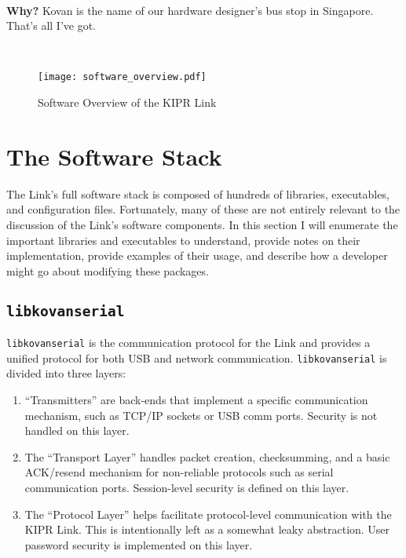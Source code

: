 \documentclass[12pt,letterpaper]{article}
\newcommand{\bcolorbox}[4]{\noindent \\ \fcolorbox{#1}{#2} {\parbox{\textwidth}{\vspace{.1em}\textbf{#3} #4\vspace{.1em}}} \\}
\newcommand{\why}[1]{\bcolorbox{black}{GhostWhite}{Why?}{#1}}
\begin{document}
	\why{Kovan is the name of our hardware designer's bus stop in Singapore. That's all I've got.}
	
	\begin{figure}[H]
		\begin{center}
			\texttt{[image: software\_overview.pdf]}
			\caption{Software Overview of the KIPR Link}
		\end{center}
	\end{figure}
	
	\section{The Software Stack}
	
	The Link's full software stack is composed of hundreds of libraries, executables, and configuration files. Fortunately, many of these
	are not entirely relevant to the discussion of the Link's software components. In this section I will enumerate the important libraries
	and executables to understand, provide notes on their implementation, provide examples of their usage, and describe how a developer
	might go about modifying these packages.
	
	\subsection{\texttt{libkovanserial}}
	\texttt{libkovanserial} is the communication protocol for the Link and provides a unified protocol for both USB and
	network communication. \texttt{libkovanserial} is divided into three layers:
	\begin{enumerate}
		\setlength{\itemsep}{0em}
		\item ``Transmitters'' are back-ends that implement a specific communication mechanism, such as TCP/IP sockets or USB comm ports.
		Security is not handled on this layer.
		\item The ``Transport Layer'' handles packet creation, checksumming, and a basic ACK/resend mechanism for non-reliable protocols such
		as serial communication ports. Session-level security is defined on this layer.
		\item The ``Protocol Layer'' helps facilitate protocol-level communication with the KIPR Link. This is intentionally left
		as a somewhat leaky abstraction. User password security is implemented on this layer.
	\end{enumerate}
	
\end{document}

